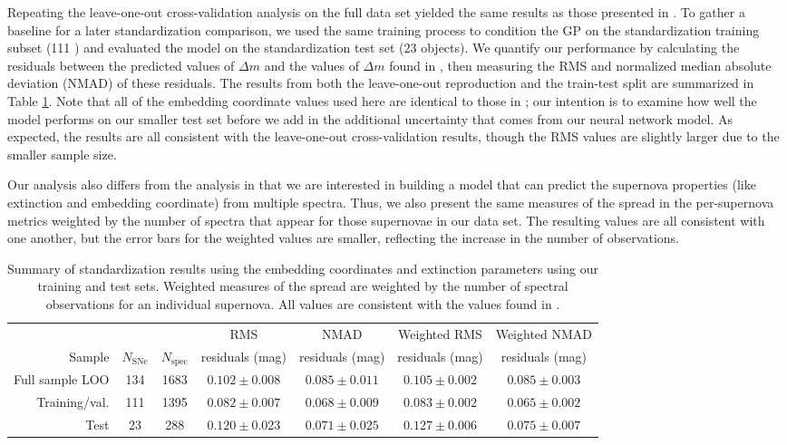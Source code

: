 Repeating the leave-one-out cross-validation analysis on the full data set yielded the same results as those presented in . To gather a baseline for a later standardization comparison, we used the same training process to condition the GP on the standardization training subset (111 \sne) and evaluated the model on the standardization test set (23 objects). We quantify our performance by calculating the residuals between the predicted values of $\Delta m$ and the values of $\Delta m$ found in , then measuring the RMS and normalized median absolute deviation (NMAD) of these residuals. The results from both the leave-one-out reproduction and the train-test split are summarized in Table \ref{tab:standardization_test_results}. Note that all of the embedding coordinate values used here are identical to those in ; our intention is to examine how well the model performs on our smaller test set before we add in the additional uncertainty that comes from our neural network model. As expected, the results are all consistent with the leave-one-out cross-validation results, though the RMS values are slightly larger due to the smaller sample size.

Our analysis also differs from the  analysis in that we are interested in building a model that can predict the supernova properties (like extinction and embedding coordinate) from multiple spectra. Thus, we also present the same measures of the spread in the per-supernova metrics weighted by the number of spectra that appear for those supernovae in our data set. The resulting values are all consistent with one another, but the error bars for the weighted values are smaller, reflecting the increase in the number of observations.

\begin{table}[htbp]
    \centering
    \begin{tabular}{rcccccc}\toprule
        & & & RMS & NMAD & Weighted RMS & Weighted NMAD\\
        Sample & $N_\textrm{SNe}$ & $N_\textrm{spec}$ & residuals (mag) & residuals (mag) & residuals (mag) & residuals (mag)\\\midrule
        Full sample LOO & 134 & 1683 & $0.102 \pm 0.008$ & $0.085 \pm 0.011$ & $0.105 \pm 0.002$ & $0.085 \pm 0.003$\\\midrule
        Training/val. & 111 & 1395 & $0.082\pm 0.007$ & $0.068\pm 0.009$ & $0.083\pm 0.002$ & $0.065\pm 0.002$\\
        Test & 23 & 288 & $0.120\pm 0.023$ &  $0.071\pm 0.025$ & $0.127\pm 0.006$ & $0.075\pm 0.007$\\
    \bottomrule
    \end{tabular}
    \caption{Summary of standardization results using the  embedding coordinates and extinction parameters using our training and test sets. Weighted measures of the spread are weighted by the number of spectral observations for an individual supernova. All values are consistent with the values found in .}
    \label{tab:standardization_test_results}
\end{table}

